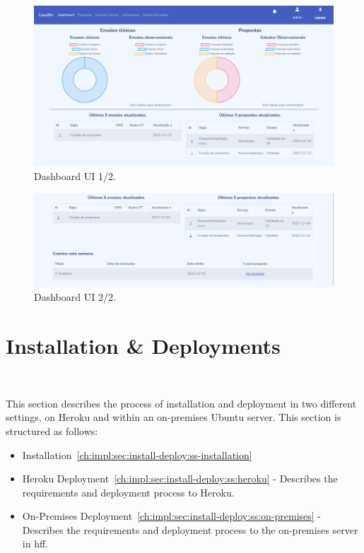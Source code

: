 \begin{figure}[H]
    \centering
    \includegraphics[scale=0.5]{Chapters/img/ui/dashboard-1.png}
    \caption{Dashboard UI 1/2.}
    \label{fig:dashboard-ui-1}
\end{figure}

\begin{figure}[H]
    \centering
    \includegraphics[scale=0.5]{Chapters/img/ui/dashboard-2.png}
    \caption{Dashboard UI 2/2.}
    \label{fig:dashboard-ui-2}
\end{figure}



\section{Installation \& Deployments}~\label{ch:impl:sec:install-deploy}

This section describes the process of installation and deployment in two different settings, on Heroku and within an on-premises Ubuntu server.
This section is structured as follows:
\begin{itemize}
    \item Installation~\ref{ch:impl:sec:install-deploy:ss-installation}
    \item Heroku Deployment~\ref{ch:impl:sec:install-deploy:ss:heroku} - Describes the requirements and deployment process to Heroku. 
    \item On-Premises Deployment~\ref{ch:impl:sec:install-deploy:ss:on-premises} - Describes the requirements and deployment process to the on-premises server in \acrshort{hff}.
\end{itemize}


